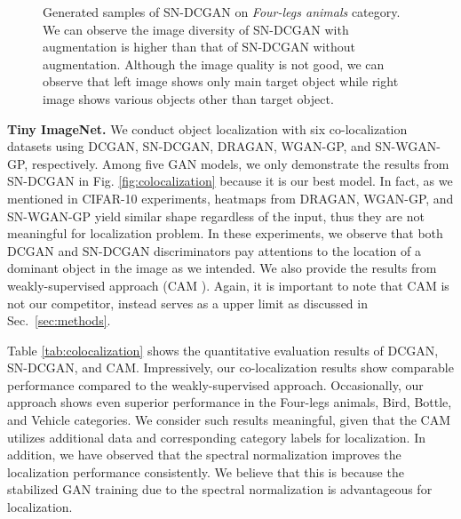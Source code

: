 \documentclass[runningheads]{llncs}
\begin{document}
\begin{figure}[t!]
    \noindent
    \begin{center}
        \quad
    \end{center}
    \vspace*{-5mm}
    \caption{Generated samples of SN-DCGAN on \emph{Four-legs animals} category. We can observe the image diversity of SN-DCGAN with augmentation is higher than that of SN-DCGAN without augmentation. Although the image quality is not good, we can observe that left image shows only main target object while right image shows various objects other than target object.}
\label{fig:augmentation}
\vspace*{-5mm}
\end{figure}

\noindent\textbf{Tiny ImageNet.} We conduct object localization with six co-localization datasets using DCGAN, SN-DCGAN, DRAGAN, WGAN-GP, and SN-WGAN-GP, respectively. Among five GAN models, we only demonstrate the results from SN-DCGAN in Fig. \ref{fig:colocalization} because it is our best model. In fact, as we mentioned in CIFAR-10 experiments, heatmaps from DRAGAN, WGAN-GP, and SN-WGAN-GP yield similar shape regardless of the input, thus they are not meaningful for localization problem. In these experiments, we observe that both DCGAN and SN-DCGAN discriminators pay attentions to the location of a dominant object in the image as we intended. We also provide the results from weakly-supervised approach (CAM \cite{zhou2016learning}). Again, it is important to note that CAM is not our competitor, instead serves as a upper limit as discussed in Sec.~\ref{sec:methods}.

Table \ref{tab:colocalization} shows the quantitative evaluation results of DCGAN, SN-DCGAN, and CAM. Impressively, our co-localization results show comparable performance compared to the weakly-supervised approach. Occasionally, our approach shows even superior performance in the Four-legs animals, Bird, Bottle, and Vehicle categories. We consider such results meaningful, given that the CAM utilizes additional data and corresponding category labels for localization. In addition, we have observed that the spectral normalization improves the localization performance consistently. We believe that this is because the stabilized GAN training due to the spectral normalization is advantageous for localization.
\end{document}
